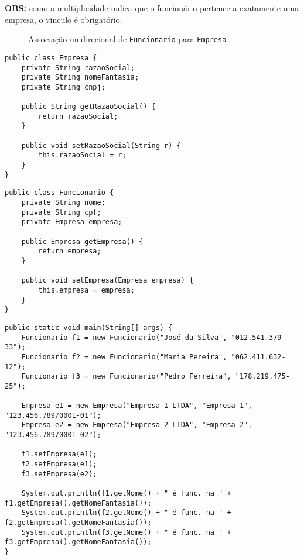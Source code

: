 \textbf{OBS:} como a multiplicidade indica que o funcionário pertence a exatamente uma empresa, o vínculo é obrigatório.

\begin{figure}[h]
	\centering
	
	
	\caption{Associação unidirecional de \texttt{Funcionario} para \texttt{Empresa}}
	\label{fig:associacao-muitos-uni-funcionario}
\end{figure}

\begin{verbatim}
public class Empresa {
	private String razaoSocial;
	private String nomeFantasia;
	private String cnpj;
	
	public String getRazaoSocial() {
		return razaoSocial; 
	}
	
	public void setRazaoSocial(String r) {
		this.razaoSocial = r; 
	}
}
\end{verbatim}

\begin{verbatim}
public class Funcionario {
	private String nome;
	private String cpf;
	private Empresa empresa;
	
	public Empresa getEmpresa() {
		return empresa; 
	}
	
	public void setEmpresa(Empresa empresa) {
		this.empresa = empresa;
	}
}
\end{verbatim}

\begin{verbatim}
public static void main(String[] args) {
	Funcionario f1 = new Funcionario("José da Silva", "012.541.379-33");
	Funcionario f2 = new Funcionario("Maria Pereira", "062.411.632-12");
	Funcionario f3 = new Funcionario("Pedro Ferreira", "178.219.475-25");
	
	Empresa e1 = new Empresa("Empresa 1 LTDA", "Empresa 1", "123.456.789/0001-01");
	Empresa e2 = new Empresa("Empresa 2 LTDA", "Empresa 2", "123.456.789/0001-02");
	
	f1.setEmpresa(e1);
	f2.setEmpresa(e1);
	f3.setEmpresa(e2);
	
	System.out.println(f1.getNome() + " é func. na " + f1.getEmpresa().getNomeFantasia());
	System.out.println(f2.getNome() + " é func. na " + f2.getEmpresa().getNomeFantasia());
	System.out.println(f3.getNome() + " é func. na " + f3.getEmpresa().getNomeFantasia());
}
\end{verbatim}
 
